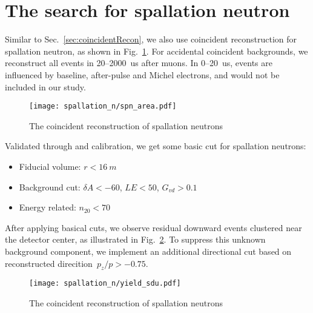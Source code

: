 \section{The search for spallation neutron}
Similar to Sec.~\ref{sec:coincidentRecon}, we also use coincident reconstruction for spallation neutron, as shown in Fig.~\ref{fig:coinRecSPN}. For accidental coincident backgrounds, we reconstruct all events in 20--\SI{2000}{us} after muons. In 0--\SI{20}{us}, events are influenced by baseline, after-pulse and Michel electrons, and would not be included in our study.
\begin{figure}
	\centering
	\texttt{[image: spallation\_n/spn\_area.pdf]}
	\caption{The coincident reconstruction of spallation neutrons}
	\label{fig:coinRecSPN}
\end{figure}

Validated through  and  calibration, we get some basic cut for spallation neutrons:
\begin{itemize}
	\item Fiducial volume: $r<\SI{16}{m}$
	\item Background cut: $\delta A<-60$, $LE<50$, $G_{vd}>0.1$
	\item Energy related: $n_{20}<70$
\end{itemize}

After applying basical cuts, we observe residual downward events clustered near the detector center, as illustrated in Fig.~\ref{fig:pzcut}. To suppress this unknown background component, we implement an additional directional cut based on reconstructed direcition~$p_z/p>-0.75$.

\begin{figure}
	\centering
	\texttt{[image: spallation\_n/yield\_sdu.pdf]}
	\caption{The coincident reconstruction of spallation neutrons}
	\label{fig:pzcut}
\end{figure}

